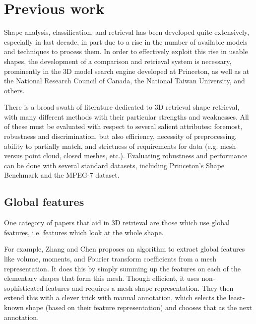 \documentclass[../tech_report_1.tex]{subfiles}
\begin{document}
\section{Previous work}

Shape analysis, classification, and retrieval has been developed quite extensively, especially in last decade, in part due to a rise in the number of available models and techniques to process them. In order to effectively exploit this rise in usable shapes, the development of a comparison and retrieval system is necessary, prominently in the 3D model search engine developed at Princeton\cite{funkhouser2003search}, as well as at the National Research Council of Canada\cite{paquet2000description}, the National Taiwan University\cite{shen20033d}, and others\cite{suzuki2001search,tangelder2003polyhedral,vranic2003improvement}.

There is a broad swath of literature dedicated to 3D retrieval shape retrieval, with many different methods with their particular strengths and weaknesses. All of these must be evaluated with respect to several salient attributes: foremost, robustness and discrimination, but also efficiency, necessity of preprocessing, ability to partially match, and strictness of requirements for data (e.g. mesh versus point cloud, closed meshes, etc.). Evaluating robustness and performance can be done with several standard datasets, including Princeton's Shape Benchmark\cite{shilane2004princeton} and the MPEG-7 dataset\cite{jeannin1999description,bober2001mpeg}.

\subsection{Global features}

One category of papers that aid in 3D retrieval are those which use global features, i.e. features which look at the whole shape.

For example, Zhang and Chen\cite{zhang2001efficient} proposes an algorithm to extract global features like volume, moments, and Fourier transform coefficients from a mesh representation. It does this by simply summing up the features on each of the elementary shapes that form this mesh. Though efficient, it uses non-sophisticated features and requires a mesh shape representation. They then extend\cite{zhang2001indexing} this with a clever trick with manual annotation, which selects the least-known shape (based on their feature representation) and chooses that as the next annotation.
\end{document}
